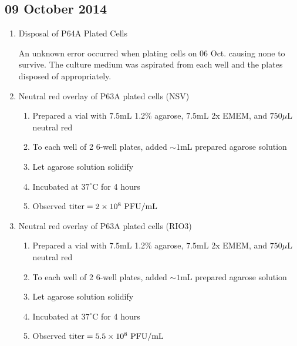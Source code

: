 
% 
% 
% 

\subsection*{09 October 2014}

\begin{enumerate}
	\item Disposal of P64A Plated Cells
	
	An unknown error occurred when plating cells on 06 Oct. causing none to survive. The culture medium was aspirated from each well and the plates disposed of appropriately.
	
	\item Neutral red overlay of P63A plated cells (NSV)
		\begin{enumerate}
			\item Prepared a vial with $7.5$mL 1.2\% agarose, $7.5$mL 2x EMEM, and $750\mu$L neutral red
			\item To each well of 2 6-well plates, added $\sim 1$mL prepared agarose solution
			\item Let agarose solution solidify
			\item Incubated at $37^{\circ}$C for 4 hours
			\item Observed $\text{titer}=2\times 10^{8}\text{ PFU/mL}$
		\end{enumerate}
	\item Neutral red overlay of P63A plated cells (RIO3)
		\begin{enumerate}
			\item Prepared a vial with $7.5$mL 1.2\% agarose, $7.5$mL 2x EMEM, and $750\mu$L neutral red
			\item To each well of 2 6-well plates, added $\sim 1$mL prepared agarose solution
			\item Let agarose solution solidify
			\item Incubated at $37^{\circ}$C for 4 hours
			\item Observed $\text{titer}=5.5\times 10^{8}\text{ PFU/mL}$
		\end{enumerate}


\end{enumerate}
